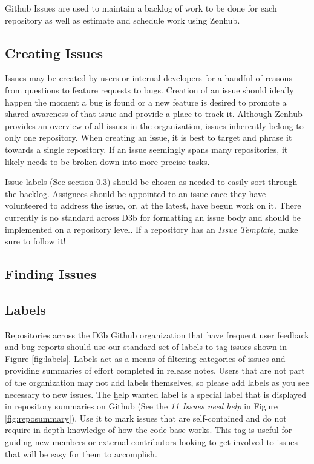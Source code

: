 \documentclass[a4paper,12pt,titlepage]{scrartcl}
\begin{document}
 	Github Issues are used to maintain a backlog of work to be done for each repository as well as estimate and schedule work using Zenhub.
 	
	\subsection{Creating Issues}
	
	Issues may be created by users or internal developers for a handful of reasons from questions to feature requests to bugs.
	Creation of an issue should ideally happen the moment a bug is found or a new feature is desired to promote a shared awareness of that issue and provide a place to track it.
	Although Zenhub provides an overview of all issues in the organization, issues inherently belong to only one repository.
	When creating an issue, it is best to target and phrase it towards a single repository.
	If an issue seemingly spans many repositories, it likely needs to be broken down into more precise tasks.
	
	Issue labels (See section \ref{labels}) should be chosen as needed to easily sort through the backlog.
	Assignees should be appointed to an issue once they have volunteered to address the issue, or, at the latest, have begun work on it.
	There currently is no standard across D3b for formatting an issue body and should be implemented on a repository level.
	If a repository has an {\em Issue Template}, make sure to follow it!
      
	\subsection{Finding Issues}
	
	
	
	\subsection{Labels}\label{labels}
	
	Repositories across the D3b Github organization that have frequent user feedback and bug reports should use our standard set of labels to tag issues shown in Figure \ref{fig:labels}.
	Labels act as a means of filtering categories of issues and providing summaries of effort completed in release notes.
	Users that are not part of the organization may not add labels themselves, so please add labels as you see necessary to new issues.
	The {\b help wanted} label is a special label that is displayed in repository summaries on Github (See the {\em 11 Issues need help} in Figure \ref{fig:reposummary}).
	Use it to mark issues that are self-contained and do not require in-depth knowledge of how the code base works.
	This tag is useful for guiding new members or external contributors looking to get involved to issues that will be easy for them to accomplish.
   
\end{document}

